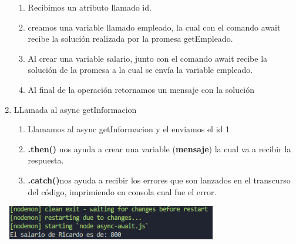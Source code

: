\documentclass{report}
\begin{document}
\begin{enumerate}
  \begin{enumerate}
    \item Recibimos un atributo llamado id.
     \item creamos una variable llamado empleado, la cual con el comando await recibe la solución realizada por la promesa getEmpleado.
     \item Al crear una variable salario, junto con el comando await recibe la solución de la promesa a la cual se envía la variable empleado.
     \item Al final de la operación retornamos un mensaje con la solución 
  \end{enumerate}
  \item LLamada al async getInformacion
  
  \begin{enumerate}
    \item Llamamos al async getInformacion y el enviamos el id 1
    \item \textbf{.then()} nos ayuda a crear una variable (\textbf{mensaje}) la cual va a recibir la respuesta.
    \item \textbf{.catch()}nos ayuda a recibir los errores que son lanzados en el transcurso del código, imprimiendo en consola cual fue el error.
  \end{enumerate}
  
\end{enumerate}
\begin{center}
  \includegraphics[width=10cm, height=1.5cm]{12.PNG}
\end{center}
\end{document}
